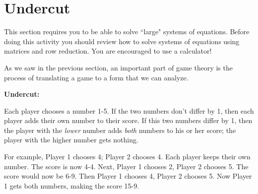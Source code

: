 
\section{Undercut}


\vspace{.2in}
This section requires you to be able to solve ``large" systems of equations. Before doing this activity you should review how to solve systems of equations using matrices and row reduction. You are encouraged to use a calculator!


\vspace{.1in}
As we saw in the previous section, an important part of game theory is the process of translating a game to a form that we can analyze. 

{\bf Undercut:}

Each player chooses a number 1-5. If the two numbers don't differ by 1, then each player adds their own number to their score. If this two numbers differ by 1, then the player with the {\it lower} number adds {\it both} numbers to his or her score; the player with the higher number gets nothing.

For example, Player 1 chooses 4; Player 2 chooses 4. Each player keeps their own number. The score is now 4-4. Next, Player 1 chooses 2, Player 2 chooses 5. The score would now be 6-9. Then Player 1 chooses 4, Player 2 chooses 5. Now Player 1 gets both numbers, making the score 15-9.

